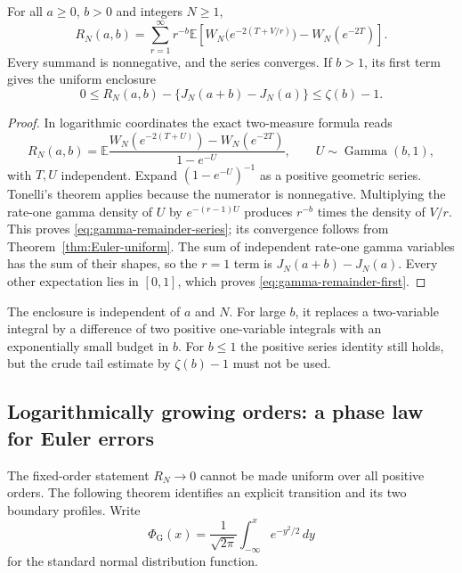 \begin{proposition}
\label{prop:gamma-remainder-series}
For all $a\geq0$, $b>0$ and integers $N\geq1$,
\begin{equation}\label{eq:gamma-remainder-series}
 R_N(a,b)=\sum_{r=1}^{\infty}r^{-b}
  \mathbb E\left[
   W_N\bigl(e^{-2(T+V/r)}\bigr)-W_N(e^{-2T})\right].
\end{equation}
Every summand is nonnegative, and the series converges.
If $b>1$, its first term gives the uniform enclosure
\begin{equation}\label{eq:gamma-remainder-first}
 0\le R_N(a,b)-\{J_N(a+b)-J_N(a)\}\le\zeta(b)-1.
\end{equation}
\end{proposition}
\begin{proof}
In logarithmic coordinates the exact two-measure formula reads
\[
 R_N(a,b)=\mathbb E
 \frac{W_N(e^{-2(T+U)})-W_N(e^{-2T})}{1-e^{-U}},
 \qquad U\sim\operatorname{Gamma}(b,1),
\]
with $T,U$ independent. Expand $(1-e^{-U})^{-1}$ as a
positive geometric series. Tonelli's theorem applies because
the numerator is nonnegative. Multiplying the rate-one gamma
density of $U$ by $e^{-(r-1)U}$ produces $r^{-b}$ times
the density of $V/r$. This proves
\eqref{eq:gamma-remainder-series}; its convergence follows
from Theorem~\ref{thm:Euler-uniform}.
The sum of independent rate-one gamma variables has the
sum of their shapes, so the $r=1$ term is
$J_N(a+b)-J_N(a)$. Every other expectation lies in $[0,1]$,
which proves \eqref{eq:gamma-remainder-first}.
\end{proof}

The enclosure is independent of $a$ and $N$. For large $b$,
it replaces a two-variable integral by a difference of two
positive one-variable integrals with an exponentially small
budget in $b$. For $b\leq1$ the positive series identity
still holds, but the crude tail estimate by $\zeta(b)-1$
must not be used.

\subsection{Logarithmically growing orders: a phase law for Euler errors}

The fixed-order statement $R_N\to0$ cannot be made uniform
over all positive orders. The following theorem identifies
an explicit transition and its two boundary profiles.
Write
\[
 \Phi_{\mathrm G}(x)=\frac1{\sqrt{2\pi}}
                    \int_{-\infty}^x e^{-y^2/2}\,dy
\]
for the standard normal distribution function.

